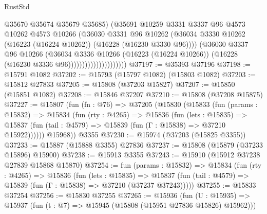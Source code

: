 \begin{lexlean}{RustStd}
\begin{coremodule}
                                      @35670
                                      @35674
                                      @35679
                                      @35685)
                                    (@35691
                                      @10259
                                      @3331
                                      @3337
                                      @96
                                      @4573
                                      @10262
                                      @4573
                                      @10266
                                      (@36030
                                        @3331
                                        @96
                                        @10262
                                        (@36034
                                          @3330
                                          @10262
                                          (@16223 (@16224 @10262))
                                          (@16228 (@16230 @3330 @96))))
                                      (@36030
                                        @3337
                                        @96
                                        @10266
                                        (@36034
                                          @3336
                                          @10266
                                          (@16223 (@16224 @10266))
                                          (@16228 (@16230 @3336 @96)))))))))))))))))))))
@37197 := @35393 @37196
@37198 := @15791 @1082
@37202 := @15793 (@15797 @1082) (@15803 @1082)
@37203 := @15812 @27833
@37205 := @15808 (@37203 @15827)
@37207 := @15850 (@15851 @1082)
@37208 := @15846 @37207
@37210 := @15808 (@37208 @15875)
@37227 := @15807
    (fun (fn : @76) =>
    @37205
      (@15830
        (@15833
          (fun (params : @15832) =>
          @15834
            (fun (rty : @4265) =>
            @15836
              (fun (lets : @15835) =>
              @15837 (fun (tail : @4579) => @15839 (fun (Γ : @15838) => @37210 @15922))))))
        @15968))
    @3355
@37230 := @15974 (@37203 (@15825 @3355))
@37233 := @15887 (@15888 @3355) @27836
@37237 := @15808 (@15879 (@37233 @15896) @15900)
@37238 := @15913 @3355
@37243 := @15910 (@15912 @37238 @27839 @15868 @15870)
@37254 := fun (params : @15832) =>
  @15834
    (fun (rty : @4265) =>
    @15836
      (fun (lets : @15835) =>
      @15837 (fun (tail : @4579) => @15839 (fun (Γ : @15838) => @37210 (@37237 @37243)))))
@37255 := @15833 @37254
@37256 := @15830 @37255
@37265 := @15936
    (fun (U : @15935) => @15937 (fun (t : @7) => @15945 (@15808 (@15951 @27836 @15826) @15962)))

\end{coremodule}
\end{lexlean}
